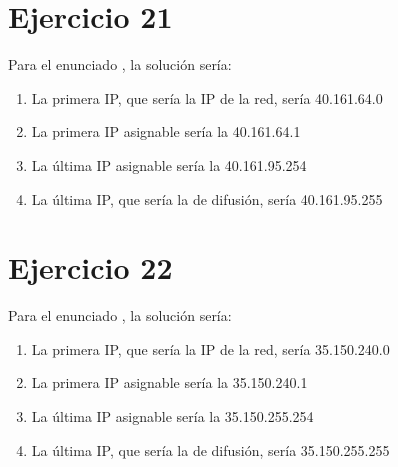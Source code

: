 \documentclass[letterpaper,10pt,spanish]{sphinxmanual}
\begin{document}
\section{Ejercicio 21}
\label{\detokenize{t2_integracion_elementos/ejercicios_subredes_ipv4/rangos_direcciones:id21}}
\sphinxAtStartPar
Para el enunciado , la solución sería:
\begin{enumerate}
%
\item {} 
\sphinxAtStartPar
La primera IP, que sería la IP de la red, sería 40.161.64.0

\item {} 
\sphinxAtStartPar
La primera IP asignable sería la 40.161.64.1

\item {} 
\sphinxAtStartPar
La última IP asignable sería la 40.161.95.254

\item {} 
\sphinxAtStartPar
La última IP, que sería la de difusión, sería 40.161.95.255

\end{enumerate}


\section{Ejercicio 22}
\label{\detokenize{t2_integracion_elementos/ejercicios_subredes_ipv4/rangos_direcciones:id22}}
\sphinxAtStartPar
Para el enunciado , la solución sería:
\begin{enumerate}
%
\item {} 
\sphinxAtStartPar
La primera IP, que sería la IP de la red, sería 35.150.240.0

\item {} 
\sphinxAtStartPar
La primera IP asignable sería la 35.150.240.1

\item {} 
\sphinxAtStartPar
La última IP asignable sería la 35.150.255.254

\item {} 
\sphinxAtStartPar
La última IP, que sería la de difusión, sería 35.150.255.255

\end{enumerate}
\end{document}
